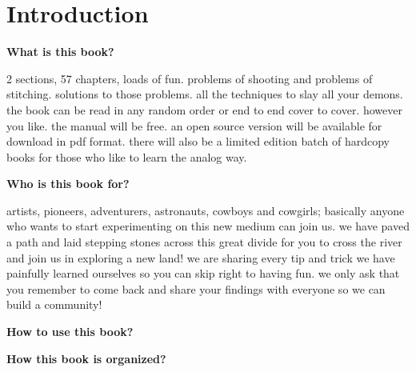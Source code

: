 \chapter{Introduction}

\textbf{What is this book?}
\begin{fullwidth}

2 sections, 57 chapters, loads of fun.
problems of shooting and problems of stitching.
solutions to those problems.
all the techniques to slay all your demons.
the book can be read in any random order or end to end cover to cover.
however you like.
the manual will be free. an open source version will be available for download in pdf format. there will also be a limited edition batch of hardcopy books for those who like to learn the analog way.

\end{fullwidth}


\textbf{Who is this book for?}
\begin{fullwidth}

artists, pioneers, adventurers, astronauts, cowboys and cowgirls; basically anyone who wants to start experimenting on this new medium can join us. we have paved a path and laid stepping stones across this great divide for you to cross the river and join us in exploring a new land! we are sharing every tip and trick we have painfully learned ourselves so you can skip right to having fun. we only ask that you remember to come back and share your findings with everyone so we can build a community!

\end{fullwidth}

\textbf{How to use this book?}
\begin{fullwidth}
\end{fullwidth}

\textbf{How this book is organized?}
\begin{fullwidth}
\end{fullwidth}

